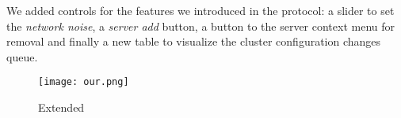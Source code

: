 We added controls for the features we introduced in the protocol: a slider to set the \emph{network noise}, a \emph{server add} button, a button to the server context menu for removal and finally a new table to visualize the cluster configuration changes queue.

\begin{figure}[h!]
    \centering
    \texttt{[image: our.png]}
    \caption{Extended}\label{fig:final}
\end{figure}
